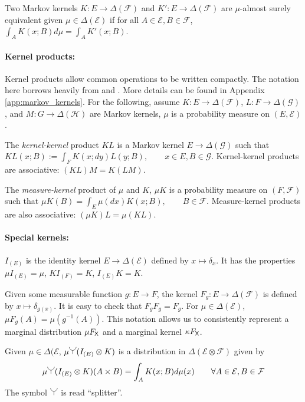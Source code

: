 Two Markov kernels $K:E\to \Delta(\mathcal{F})$ and $K':E\to \Delta(\mathcal{F})$ are $\mu$-almost surely equivalent given $\mu\in \Delta(\mathcal{E})$ if for all $A\in \mathcal{E}, B\in\mathcal{F}$, $\int_A K(x;B) d\mu = \int_A K'(x;B)$.


\paragraph*{Kernel products:} Kernel products allow common operations to be written compactly. The notation here borrows heavily from \cite{cinlar_probability_2011} and \cite{fong_causal_2013}. More details can be found in Appendix \ref{app:markov_kernels}. For the following, assume $K:E\to \Delta(\mathcal{F})$, $L:F\to \Delta(\mathcal{G})$, and $M:G\to \Delta(\mathcal{H})$ are Markov kernels, $\mu$ is a probability measure on $(E,\mathcal{E})$. 

The \emph{kernel-kernel} product $KL$ is a Markov kernel $E\to \Delta(\mathcal{G})$ such that $KL(x;B):= \int_F K(x;dy) L(y;B),\qquad x\in E, B\in \mathcal{G}$. Kernel-kernel products are associative: $(KL)M=K(LM)$.

The \emph{measure-kernel} product of $\mu$ and $K$, $\mu K$ is a probability measure on $(F,\mathcal{F})$ such that $\mu K(B)=\int_E \mu(dx) K(x;B),\qquad B\in\mathcal{F}$. Measure-kernel products are also associative: $(\mu K)L = \mu (KL)$.

\paragraph*{Special kernels:} $I_{(E)}$ is the identity kernel $E\to \Delta(\mathcal{E})$ defined by $x\mapsto \delta_x$. It has the properties $\mu I_{(E)}=\mu$, $KI_{(F)} = K$, $I_{(E)} K = K$.

Given some measurable function $g:E\to F$, the kernel $F_g:E\to \Delta(\mathcal{F})$ is defined by $x\mapsto \delta_{g(x)}$. It is easy to check that $F_g F_g = F_g$. For $\mu\in \Delta(\mathcal{E})$, $\mu F_g (A) = \mu(g^{-1}(A))$. This notation allows us to consistently represent a marginal distribution $\mu F_{\mathsf{X}}$ and a marginal kernel $\kappa F_{\mathsf{X}}$.

Given $\mu\in \Delta(\mathcal{E}$, $\mu\splitter{0.15}(I_{(E)}\otimes K)$ is a distribution in $\Delta(\mathcal{E}\otimes\mathcal{F})$ given by
\begin{align}
    \mu\splitter{0.15}(I_{(E)}\otimes K)(A\times B) = \int_A K(x;B) d\mu(x)\qquad \forall A\in \mathcal{E},B\in \mathcal{F}
\end{align}
The symbol $\splitter{0.15}$ is read ``splitter''.




